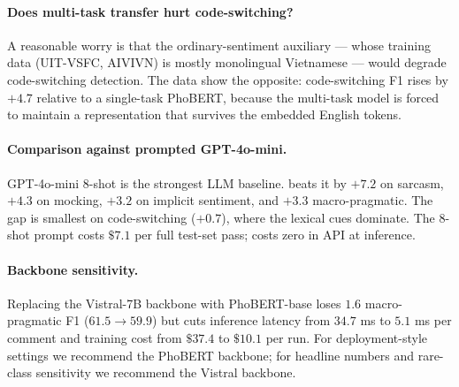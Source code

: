 \paragraph{Does multi-task transfer hurt code-switching?}
A reasonable worry is that the ordinary-sentiment auxiliary --- whose
training data (UIT-VSFC, AIVIVN) is mostly monolingual Vietnamese ---
would degrade code-switching detection. The data show the opposite:
code-switching F1 rises by $+4.7$ relative to a single-task PhoBERT,
because the multi-task model is forced to maintain a representation
that survives the embedded English tokens.

\paragraph{Comparison against prompted GPT-4o-mini.}
GPT-4o-mini 8-shot is the strongest LLM baseline. \method{} beats it
by $+7.2$ on sarcasm, $+4.3$ on mocking, $+3.2$ on implicit
sentiment, and $+3.3$ macro-pragmatic. The gap is smallest on
code-switching ($+0.7$), where the lexical cues dominate. The 8-shot
prompt costs $\$7.1$ per full test-set pass; \method{} costs zero in
API at inference.

\paragraph{Backbone sensitivity.}
Replacing the Vistral-7B backbone with PhoBERT-base loses $1.6$
macro-pragmatic F1 ($61.5 \to 59.9$) but cuts inference latency from
$34.7$ ms to $5.1$ ms per comment and training cost from $\$37.4$ to
$\$10.1$ per run. For deployment-style settings we recommend the
PhoBERT backbone; for headline numbers and rare-class sensitivity we
recommend the Vistral backbone.
